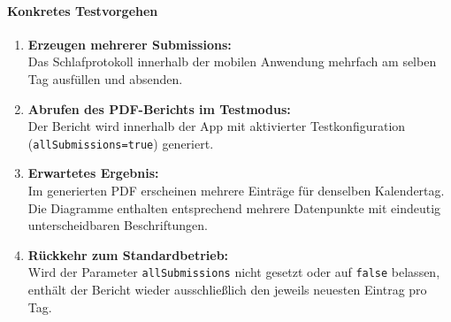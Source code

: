 \paragraph{Konkretes Testvorgehen}
\begin{enumerate}
  \item \textbf{Erzeugen mehrerer Submissions:}\\
  Das Schlafprotokoll innerhalb der mobilen Anwendung mehrfach am selben Tag
  ausfüllen und absenden.

  \item \textbf{Abrufen des PDF-Berichts im Testmodus:}\\
  Der Bericht wird innerhalb der App mit aktivierter Testkonfiguration
  (\texttt{allSubmissions=true}) generiert.

  \item \textbf{Erwartetes Ergebnis:}\\
  Im generierten PDF erscheinen mehrere Einträge für denselben Kalendertag.
  Die Diagramme enthalten entsprechend mehrere Datenpunkte mit eindeutig
  unterscheidbaren Beschriftungen.

  \item \textbf{Rückkehr zum Standardbetrieb:}\\
  Wird der Parameter \texttt{allSubmissions} nicht gesetzt oder auf
  \texttt{false} belassen, enthält der Bericht wieder ausschließlich den
  jeweils neuesten Eintrag pro Tag.
\end{enumerate}












